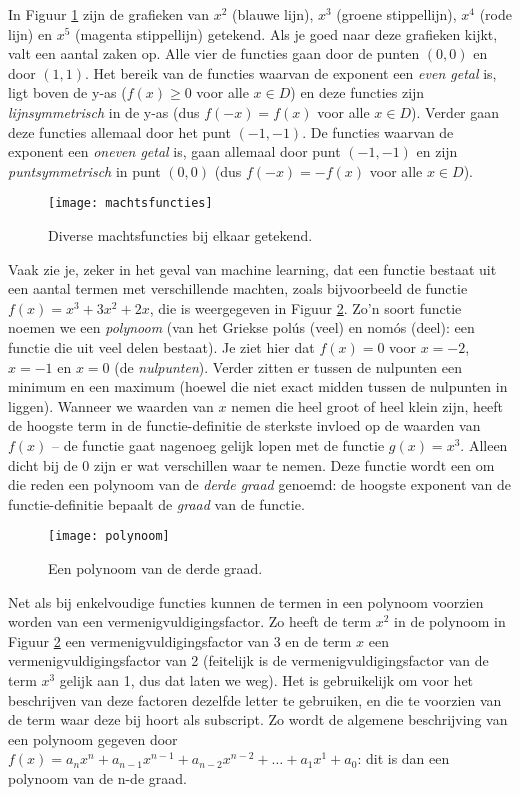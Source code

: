 In Figuur \ref{img:machtsfuncties} zijn de grafieken van $x^2$ (blauwe lijn), $x^3$ (groene stippellijn), $x^4$ (rode lijn) en $x^5$ (magenta stippellijn) getekend. Als je goed naar deze grafieken kijkt, valt een aantal zaken op. Alle vier de functies gaan door de punten $(0,0)$ en door $(1,1)$. Het bereik van de functies waarvan de exponent een \textit{even getal} is, ligt boven de y-as ($f(x) \geq 0$ voor alle $x \in D$) en deze functies zijn \textit{lijnsymmetrisch} in de y-as (dus $f(-x) = f(x)$ voor alle $x \in D$). Verder gaan deze functies allemaal door het punt $(-1, -1)$. De functies waarvan de exponent een \textit{oneven getal} is, gaan allemaal door punt $(-1,-1)$ en zijn \textit{puntsymmetrisch} in punt $(0,0)$ (dus $f(-x)=-f(x)$ voor alle $x \in D$).

\begin{figure}[h]
    \centering
    \texttt{[image: machtsfuncties]}
    \caption{Diverse machtsfuncties bij elkaar getekend.\label{img:machtsfuncties}}
\end{figure}

Vaak zie je, zeker in het geval van machine learning, dat een functie bestaat uit een aantal termen met verschillende machten, zoals bijvoorbeeld de functie $f(x) = x^3+3x^2+2x$, die is weergegeven in Figuur \ref{img:polynoom}. Zo'n soort functie noemen we een \textit{polynoom} (van het Griekse polús (veel) en nomós (deel): een functie die uit veel delen bestaat). Je ziet hier dat $f(x)=0$ voor $x=-2$, $x=-1$ en $x=0$ (de \textit{nulpunten}). Verder zitten er  tussen de nulpunten een minimum en een maximum (hoewel die niet exact midden tussen de nulpunten in liggen). Wanneer we waarden van $x$ nemen die heel groot of heel klein zijn, heeft de hoogste term in de functie-definitie de sterkste invloed op de waarden van $f(x)$ – de functie gaat nagenoeg gelijk lopen met de functie $g(x)=x^3$. Alleen dicht bij de 0 zijn er wat verschillen waar te nemen. Deze functie wordt een om die reden een polynoom van de \textit{derde graad} genoemd: de hoogste exponent van de functie-definitie bepaalt de \textit{graad} van de functie. 


\begin{figure}[h]
    \centering
    \texttt{[image: polynoom]}
    \caption{Een polynoom van de derde graad.\label{img:polynoom}}
\end{figure}

Net als bij enkelvoudige functies kunnen de termen in een polynoom voorzien worden van een vermenigvuldigingsfactor. Zo heeft de term $x^2$ in de polynoom in Figuur \ref{img:polynoom} een vermenigvuldigingsfactor van 3 en de term $x$ een vermenigvuldigingsfactor van 2 (feitelijk is de vermenigvuldigingsfactor van de term $x^3$ gelijk aan 1, dus dat laten we weg). Het is gebruikelijk om voor het beschrijven van deze factoren dezelfde letter te gebruiken, en die te voorzien van de term waar deze bij hoort als subscript. Zo wordt de algemene beschrijving van een polynoom gegeven door $f(x) = a_nx^n + a_{n-1}x^{n-1} + a_{n-2}x^{n-2}+ \dots + a_1x^1+a_0$: dit is dan een polynoom van de n-de graad.


